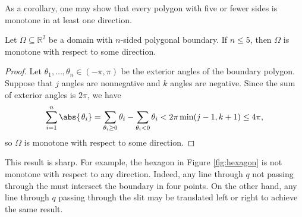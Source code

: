 As a corollary, one may show that every polygon with five or fewer sides is monotone in at least one direction.

\begin{corollary}
Let $\Omega \subseteq \mathbb{R}^2$ be a domain with $n$-sided polygonal boundary. If $n \leq 5$, then $\Omega$ is monotone with respect to some direction.
\end{corollary}
\begin{proof}
  Let $\theta_1, \ldots, \theta_n \in (-\pi, \pi)$ be the exterior angles of the boundary polygon. Suppose that $j$ angles are nonnegative and $k$ angles are negative. Since the sum of exterior angles is $2\pi$, we have
  \begin{equation}
    \sum_{i = 1}^{n} \abs{\hspace{1pt}\theta_i} = \sum_{\theta_i \geq 0} \theta_i -  \sum_{\theta_i < 0} \theta_i < 2\pi\min (j-1, k+1) \leq 4\pi,
  \end{equation}
  so $\Omega$ is monotone with respect to some direction.
\end{proof}



This result is sharp. For example, the hexagon in Figure \ref{fig:hexagon} is not monotone with respect to any direction. Indeed, any line through $q$ not passing through the \protect{} must intersect the boundary in four points. On the other hand, any line through $q$ passing through the slit may be translated left or right to achieve the same result.